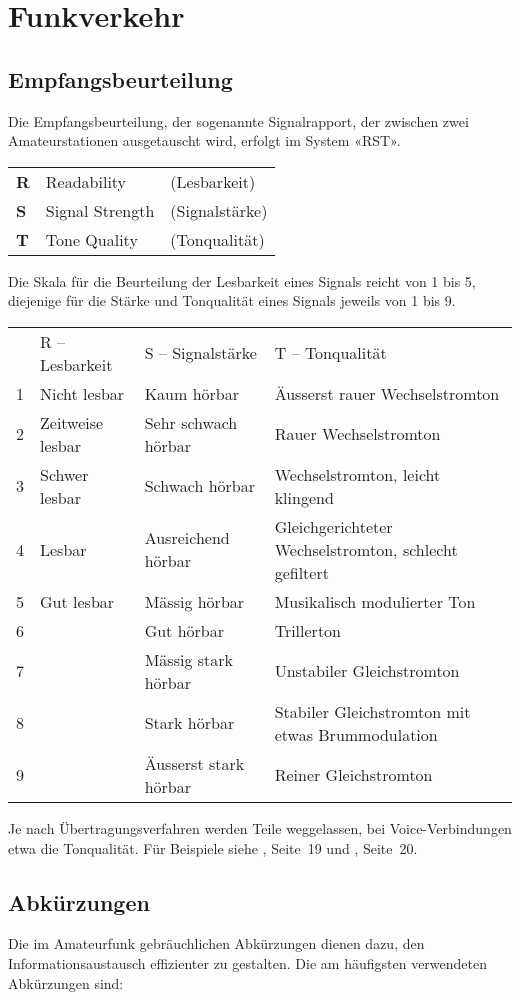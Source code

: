 \chapter{Funkverkehr}
\section{Empfangsbeurteilung}
Die Empfangsbeurteilung, der sogenannte Signalrapport, der zwischen zwei Amateurstationen aus­getauscht wird, erfolgt im System «RST».

\begin{tabular}{lll}
\textbf{R} & Readability & (Lesbarkeit) \\
\textbf{S} & Signal Strength & (Signalstärke)\\
\textbf{T} & Tone Quality & (Tonqualität)
\end{tabular}

Die Skala für die Beurteilung der Lesbarkeit eines Signals reicht von 1 bis 5, diejenige für die Stärke und Tonqualität eines Signals jeweils von 1 bis 9.

\begin{tabular}{llll}
 & R – Lesbarkeit & S – Signalstärke & T – Tonqualität \\
1 & Nicht lesbar & Kaum hörbar & Äusserst rauer Wechselstromton \\
2 & Zeitweise lesbar & Sehr schwach hörbar & Rauer Wechselstromton \\
3 & Schwer lesbar & Schwach hörbar & Wechselstromton, leicht klingend \\
4 & Lesbar & Ausreichend hörbar & Gleichgerichteter Wechselstromton, schlecht gefiltert \\
5 & Gut lesbar & Mässig hörbar & Musikalisch modulierter Ton \\
6 &  & Gut hörbar & Trillerton \\
7 &  & Mässig stark hörbar & Unstabiler Gleichstromton \\
8 &  & Stark hörbar & Stabiler Gleichstromton  mit etwas Brummodulation \\
9 &  & Äusserst stark hörbar & Reiner Gleichstromton
\end{tabular}

Je nach Übertragungsverfahren werden Teile weggelassen, bei Voice-Verbindungen etwa die Tonqualität. Für Beispiele siehe , Seite 19 und , Seite 20.

\section{Abkürzungen}
Die im Amateurfunk gebräuchlichen Abkürzungen dienen dazu, den Informationsaustausch effizienter zu gestalten. Die am häufigsten verwendeten Abkürzungen sind:


